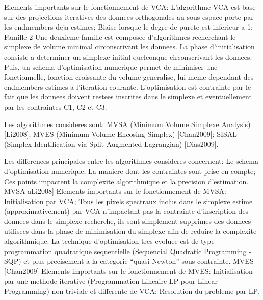 Elements importants sur le fonctionnement de VCA: L'algorithme VCA
est base sur des projections iteratives des donnees orthogonales au
sous-espace porte par les endmembers deja estimes; Biaise lorsque le
degre de purete est inferieur a 1; Famille 2 Une deuxieme famille est
composee d'algorithmes recherchant le simplexe de volume minimal
circonscrivant les donnees. La phase d'initialisation consiste a
determiner un simplexe initial quelconque circonscrivant les
donnees. Puis, un schema d'optimisation numerique permet de minimiser
une fonctionnelle, fonction croissante du volume generalise, lui-meme
dependant des endmembers estimes a l'iteration
courante. L'optimisation est contrainte par le fait que les donnees
doivent restees inscrites dans le simplexe et eventuellement par les
contraintes C1, C2 et C3.

Les algorithmes consideres sont: MVSA (Minimum Volume Simplexe
Analysis) [Li2008]; MVES (Minimum Volume Encosing Simplex)
[Chan2009]; SISAL (Simplex Identification via Split Augmented
Lagrangian) [Dias2009]. 

Les differences principales entre les algorithmes consideres
concernent: 
Le schema d'optimisation numerique; 
La maniere dont les
contraintes sont prise en compte; 
Ces points impactent la complexite
algorithmique et la precision d'estimation.  MVSA aLi2008] Elements
  importants sur le fonctionnement de MVSA: Initialisation par VCA;
  Tous les pixels spectraux inclus dans le simplexe estime
  (approximativement) par VCA n'impactant pas la contrainte
  d'inscription des donnees dans le simplexe recherche, ils sont
  simplement supprimes des donnees utilisees dans la phase de
  minimisation du simplexe afin de reduire la complexite
  algorithmique.  La technique d'optimisation tres evoluee est de type
  programmation quadratique sequentielle (Sequencial Quadratic
  Programming - SQP) et plus precisement a la categorie
  ``quasi-Newton'' sous contrainte.  MVES [Chan2009] Elements
  importants sur le fonctionnement de MVES: Initialisation par une
  methode iterative (Programmation Lineaire LP pour Linear
  Programming) non-triviale et differente de VCA; Resolution du
  probleme par LP.


